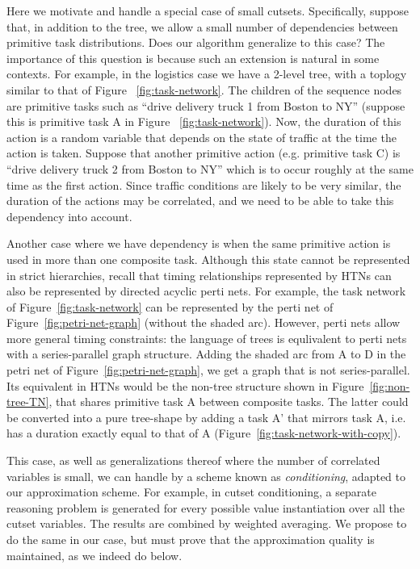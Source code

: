 \documentclass[review]{elsarticle}
\begin{document}
Here we motivate and handle a special case of small cutsets. 
Specifically, suppose that, in addition to the tree, we allow a small number of dependencies
between primitive task distributions. Does our algorithm generalize to this case?
The importance of this question is because such an extension is natural in some contexts. For example,
in the logistics case we have a 2-level tree, with a toplogy similar to that of Figure ~\ref{fig:task-network}.
The children of the sequence nodes are primitive tasks such as
``drive delivery truck 1 from Boston to NY'' (suppose this is primitive task A in  Figure ~\ref{fig:task-network}).
Now, the duration of this action is a random variable
that depends on the state of traffic at the time the action is taken. Suppose that another
primitive action (e.g. primitive task C) is ``drive delivery truck 2 from Boston to NY'' which is to occur roughly at the
same time as the first action. Since traffic conditions are likely to be very similar, the
duration of the actions may be correlated, and we need to be able to take
this dependency into account.

Another case where we have dependency is when the same primitive action is 
used in more than one composite task. Although this state cannot be represented in
strict hierarchies, recall that timing relationships represented by HTNs can also be
represented by directed acyclic perti nets. For example, the task network of Figure~\ref{fig:task-network}
can be represented by the perti net of Figure~\ref{fig:petri-net-graph} (without the shaded arc). However, perti nets allow more general
timing constraints: the language of trees is equlivalent to perti nets with a series-parallel
graph structure. Adding the shaded arc from A to D in the petri net of Figure~\ref{fig:petri-net-graph}, 
we get a graph that is not series-parallel. Its equivalent in HTNs would be the non-tree structure
shown in Figure~\ref{fig:non-tree-TN}, that shares primitive task A between composite tasks. 
The latter could be converted into a pure tree-shape by adding a task A' that mirrors task A,
i.e. has a duration exactly equal to that of A (Figure~\ref{fig:task-network-with-copy}).

This case, as well as generalizations thereof where the number of correlated variables is small,
we can handle by a scheme known as {\em conditioning}, adapted to our approximation scheme.
For example, in cutset conditioning, a separate reasoning problem is generated
for every possible value instantiation over all the cutset variables. The results
are combined by weighted averaging. We propose to do the same in our case, but must prove
that the approximation quality is maintained, as we indeed do below.
\end{document}
